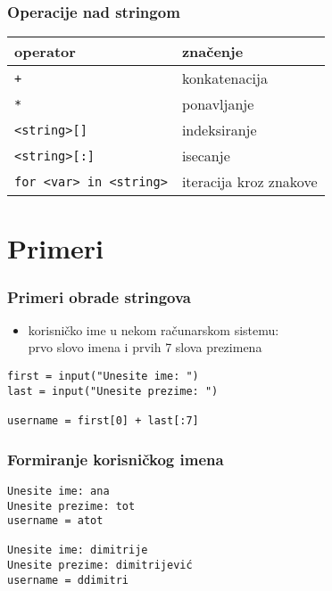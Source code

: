 \documentclass[utf8,compress,aspectratio=169]{beamer}
\begin{document}
\begin{frame}[fragile]
  \frametitle{Operacije nad stringom}
\begin{center}
\begin{tabular}{l|l}
\textbf{operator} & \textbf{značenje} \\ \hline
\texttt{+} & konkatenacija \\
\texttt{*} & ponavljanje \\
\texttt{<string>[]} & indeksiranje \\
\texttt{<string>[:]} & isecanje \\
\texttt{for <var> in <string>} & iteracija kroz znakove
\end{tabular}
\end{center}
\end{frame}

\section{Primeri}

\begin{frame}[fragile]
  \frametitle{Primeri obrade stringova}
  \begin{itemize}
    \item korisničko ime u nekom računarskom sistemu: \\
      prvo slovo imena i prvih 7 slova prezimena
  \end{itemize}
\begin{verbatim}
first = input("Unesite ime: ")
last = input("Unesite prezime: ")

username = first[0] + last[:7]
\end{verbatim}
\end{frame}

\begin{frame}[fragile]
  \frametitle{Formiranje korisničkog imena}
\begin{verbatim}
Unesite ime: ana
Unesite prezime: tot
username = atot

Unesite ime: dimitrije
Unesite prezime: dimitrijević
username = ddimitri
\end{verbatim}
\end{frame}
\end{document}
